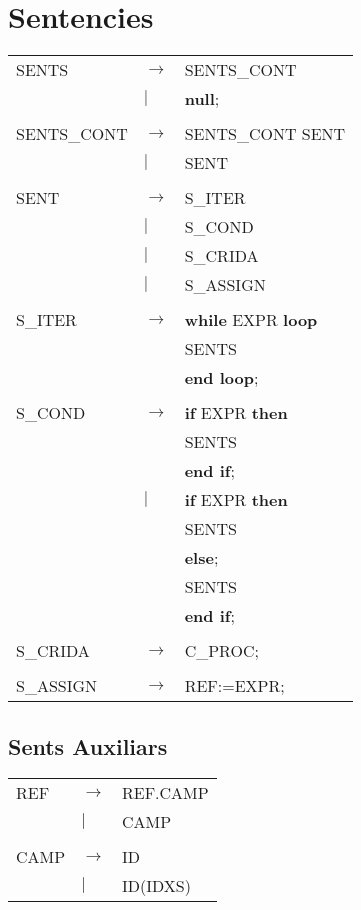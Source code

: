 \documentclass{article}
\begin{document}
	\section{Sentencies}
	\begin{tabular}{l l l}
		SENTS&$\to$&SENTS\_CONT\\
		&$|$&\textbf{null};\\
		\\
		SENTS\_CONT&$\to$&SENTS\_CONT SENT\\
		&$|$&SENT\\
		\\
		SENT&$\to$&S\_ITER\\
		&$|$&S\_COND\\
		&$|$&S\_CRIDA\\
		&$|$&S\_ASSIGN\\
		\\
		S\_ITER&$\to$&\textbf{while} EXPR \textbf{loop}\\
		&&\hspace*{5mm}SENTS\\
		&&\textbf{end loop};\\
		\\
		S\_COND&$\to$&\textbf{if} EXPR \textbf{then}\\
		&&\hspace*{5mm}SENTS\\
		&&\textbf{end if};\\
		&$|$&\textbf{if} EXPR \textbf{then}\\
		&&\hspace*{5mm}SENTS\\
		&&\textbf{else};\\
		&&\hspace*{5mm}SENTS\\
		&&\textbf{end if};\\
		\\
		S\_CRIDA&$\to$&C\_PROC;\\
		\\
		S\_ASSIGN&$\to$&REF:=EXPR;
	\end{tabular}
	\subsection{Sents Auxiliars}
	\begin{tabular}{l l l}
		REF&$\to$&REF.CAMP\\
		&$|$&CAMP\\
		\\
		CAMP&$\to$&ID\\
		&$|$&ID(IDXS)
	\end{tabular}
\end{document}
